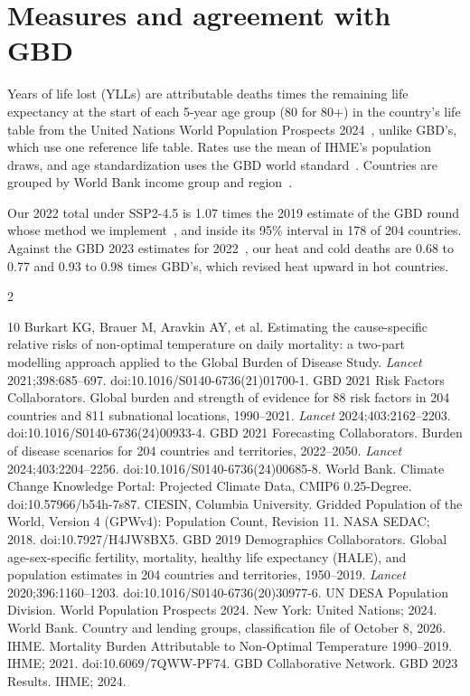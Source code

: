\documentclass[11pt]{ozreport}
\begin{document}
\section{Measures and agreement with GBD}

Years of life lost (YLLs) are attributable deaths times the remaining life expectancy at the start of each 5-year age group (80 for 80+) in the country's life table from the United Nations World Population Prospects 2024~\cite{wpp2024}, unlike GBD's, which use one reference life table. Rates use the mean of IHME's population draws, and age standardization uses the GBD world standard~\cite{gbd2019demog}. Countries are grouped by World Bank income group and region~\cite{wbclass}.

Our 2022 total under SSP2-4.5 is 1.07 times the 2019 estimate of the GBD round whose method we implement~\cite{ihme2021temp}, and inside its 95\% interval in 178 of 204 countries. Against the GBD 2023 estimates for 2022~\cite{gbd2023results}, our heat and cold deaths are 0.68 to 0.77 and 0.93 to 0.98 times GBD's, which revised heat upward in hot countries.

\begin{multicols}{2}
\begin{thebibliography}{10}
\scriptsize\setlength{\itemsep}{0pt}\setlength{\parskip}{0pt}
 Burkart KG, Brauer M, Aravkin AY, et al. Estimating the cause-specific relative risks of non-optimal temperature on daily mortality: a two-part modelling approach applied to the Global Burden of Disease Study. \emph{Lancet} 2021;398:685--697. doi:10.1016/S0140-6736(21)01700-1.
 GBD 2021 Risk Factors Collaborators. Global burden and strength of evidence for 88 risk factors in 204 countries and 811 subnational locations, 1990--2021. \emph{Lancet} 2024;403:2162--2203. doi:10.1016/S0140-6736(24)00933-4.
 GBD 2021 Forecasting Collaborators. Burden of disease scenarios for 204 countries and territories, 2022--2050. \emph{Lancet} 2024;403:2204--2256. doi:10.1016/S0140-6736(24)00685-8.
 World Bank. Climate Change Knowledge Portal: Projected Climate Data, CMIP6 0.25-Degree. doi:10.57966/b54h-7s87.
 CIESIN, Columbia University. Gridded Population of the World, Version 4 (GPWv4): Population Count, Revision 11. NASA SEDAC; 2018. doi:10.7927/H4JW8BX5.
 GBD 2019 Demographics Collaborators. Global age-sex-specific fertility, mortality, healthy life expectancy (HALE), and population estimates in 204 countries and territories, 1950--2019. \emph{Lancet} 2020;396:1160--1203. doi:10.1016/S0140-6736(20)30977-6.
 UN DESA Population Division. World Population Prospects 2024. New York: United Nations; 2024.
 World Bank. Country and lending groups, classification file of October 8, 2026.
 IHME. Mortality Burden Attributable to Non-Optimal Temperature 1990--2019. IHME; 2021. doi:10.6069/7QWW-PF74.
 GBD Collaborative Network. GBD 2023 Results. IHME; 2024.
\end{thebibliography}
\end{multicols}
\end{document}
